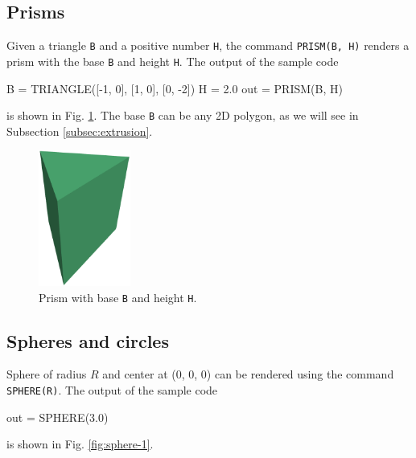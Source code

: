 \subsection{Prisms}\label{subsec:prism}

Given a triangle {\tt B} and a positive number {\tt H}, the command 
{\tt PRISM(B, H)} renders a prism with the base {\tt B} and height {\tt H}. 
The output of the sample code

\begin{bluecode}
B = TRIANGLE([-1, 0], [1, 0], [0, -2])
H = 2.0
out = PRISM(B, H)
\end{bluecode}
is shown in Fig. \ref{fig:prism}. The base {\tt B} can be any 2D polygon,
as we will see in Subsection \ref{subsec:extrusion}.\\

\begin{figure}[!ht]
\begin{center}
\includegraphics[width=0.27\textwidth]{img/prism-0.png}
\end{center}
\vspace{-4mm}
\caption{Prism with base {\tt B} and height {\tt H}.}
\label{fig:prism}
\vspace{-1cm}
\end{figure}


\subsection{Spheres and circles}

Sphere of radius $R$ and center at (0, 0, 0) can be rendered using the command 
{\tt SPHERE(R)}. The output of the sample code

\begin{bluecode}
out = SPHERE(3.0)
\end{bluecode}
is shown in Fig. \ref{fig:sphere-1}.

